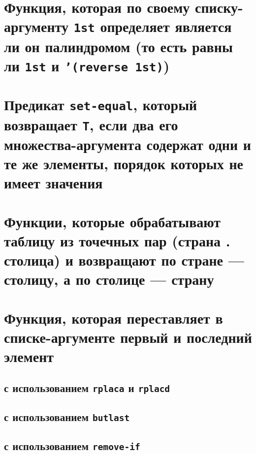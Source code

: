 
\section{Функция, которая по своему списку-аргументу \texttt{1st} определяет является ли он палиндромом (то есть равны ли \texttt{1st} и \texttt{'(reverse 1st)})}



\section{Предикат \texttt{set-equal}, который возвращает \texttt{T}, если два его множества-аргу\-мента содержат одни и те же элементы, порядок которых не имеет значения}




\section{Функции, которые обрабатывают таблицу из точечных пар (страна . столица) и возвращают по стране --- столицу, а по столице --- страну}




\section{Функция, которая переставляет в списке-аргументе первый и последний элемент}


\subsection{с использованием \texttt{rplaca} и \texttt{rplacd}}



\subsection{с использованием \texttt{butlast}}



\subsection{с использованием \texttt{remove-if}}


